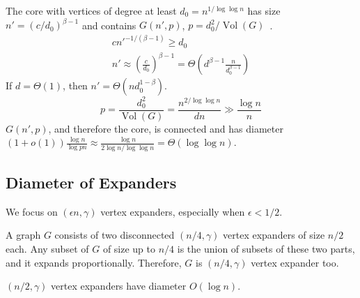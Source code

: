 \documentclass{beamer}
\DeclareMathOperator*{\Vol}{Vol}
\newcommand{\autotitle}{\secname\ifdefempty{\subsecname}{}{~--- \subsecname}}
\begin{document}
\begin{frame}{\autotitle}
    The core with vertices of degree at least $d_0=n^{1/\log\log n}$ has size
    $n'=(c/d_0)^{\beta-1}$ and contains $G(n',p)$, $p=d_0^2/\Vol(G)$~\cite{cl04}.
    \begin{gather*}
        cn'^{-1/(\beta-1)}\geq d_0\\
        n'\approx\left(\frac{c}{d_0}\right)^{\beta-1}
        =\Theta\left(d^{\beta-1}\frac{n}{d_0^{\beta-1}}\right)
    \end{gather*}
    If $d=\Theta(1)$, then $n'=\Theta(nd_0^{1-\beta})$.
    \begin{equation*}
        p=\frac{d_0^2}{\Vol(G)}=\frac{n^{2/\log\log n}}{dn}\gg\frac{\log n}{n}
    \end{equation*}
    $G(n',p)$, and therefore the core, is connected and has diameter
    $(1+o(1))\frac{\log n}{\log pn}
    \approx\frac{\log n}{2\log n/\log\log n}=\Theta(\log\log n)$.
\end{frame}

\subsection{Diameter of Expanders}

\begin{frame}{\autotitle}
    We focus on $(\epsilon n,\gamma)$ vertex expanders,
    especially when $\epsilon<1/2$.
    \begin{example}
        A graph $G$ consists of two disconnected $(n/4,\gamma)$
        vertex expanders of size $n/2$ each.
        Any subset of $G$ of size up to $n/4$ is the union of subsets
        of these two parts, and it expands proportionally.
        Therefore, $G$ is $(n/4,\gamma)$ vertex expander too.
    \end{example}
    \begin{theorem}
        $(n/2,\gamma)$ vertex expanders have diameter $O(\log n)$.
    \end{theorem}
\end{frame}
\end{document}
